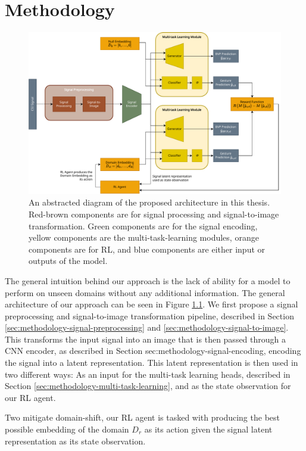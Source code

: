 \chapter{Methodology}\label{chapter:methodology}

\begin{figure}
	\centering
	\includegraphics[width=\linewidth]{figures/arch_diagram.pdf}
	\caption{An abstracted diagram of the proposed architecture in this thesis. Red-brown components are for signal processing and signal-to-image transformation. Green components are for the signal encoding, yellow components are the multi-task-learning modules, orange components are for RL, and blue components are either input or outputs of the model.}
	\label{fig:arch-diagram}
\end{figure}

The general intuition behind our approach is the lack of ability for a model to perform on unseen domains without any additional information.
The general architecture of our approach can be seen in Figure \ref{fig:arch-diagram}.
We first propose a signal preprocessing and signal-to-image transformation pipeline, described in Section \ref{sec:methodology-signal-preprocessing} and \ref{sec:methodology-signal-to-image}.
This transforms the input signal into an image that is then passed through a CNN encoder, as described in Section {sec:methodology-signal-encoding}, encoding the signal into a latent representation.
This latent representation is then used in two different ways: As an input for the multi-task learning heads, described in Section \ref{sec:methodology-multi-task-learning}, and as the state observation for our RL agent.

Two mitigate domain-shift, our RL agent is tasked with producing the best possible embedding of the domain $D_{r}$ as its action given the signal latent representation as its state observation.

